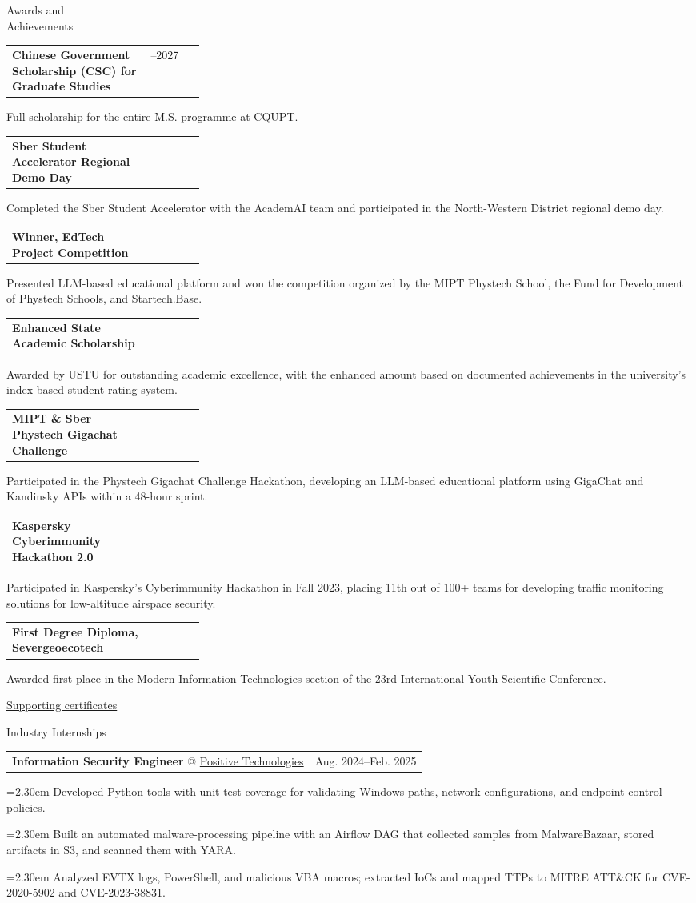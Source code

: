 \documentclass[11pt,a4paper]{article}
\makeatletter
\newcommand{\cvrow}[2]{%
  \noindent
  \begin{minipage}[t]{0.145\textwidth}
    \vspace{0pt}%
    \raggedright
    \fontsize{10.5}{12.5}\selectfont
    #1
  \end{minipage}%
  \hfill
  \begin{minipage}[t]{0.835\textwidth}
    \vspace{0pt}%
    #2
  \end{minipage}\par
}
\newcommand{\entry}[2]{%
  \begin{tabularx}{\linewidth}{@{}X >{\raggedleft\arraybackslash}p{0.28\linewidth}@{}}
    #1 & #2
  \end{tabularx}
}
\newcommand{\workentry}[2]{%
  \noindent
  \begin{tabularx}{\linewidth}
    {@{}X@{\hspace{0.8em}}r@{}}
    #1 & \small #2
  \end{tabularx}\par
  \vspace{0.15em}
}
\newcommand{\workproject}[1]{%
  \noindent
  \hangindent=2.30em
  \hangafter=1
  \hspace*{1.15em}\makebox[1.15em][l]{$\diamond$}#1\par
  \vspace{0.12em}
}
\makeatother
\begin{document}
\cvrow{Awards and\\Achievements}{%
  \entry
    {\textbf{Chinese Government Scholarship (CSC) for Graduate Studies}}
    {2024--2027}
  Full scholarship for the entire M.S. programme at CQUPT.

  \vspace{0.45em}
  \entry
    {\textbf{Sber Student Accelerator Regional Demo Day}}
    {2023}
  Completed the Sber Student Accelerator with the AcademAI team and
  participated in the North-Western District regional demo day.

  \vspace{0.45em}
  \entry
    {\textbf{Winner, EdTech Project Competition}}
    {2023}
  Presented LLM-based educational platform and won the competition organized
  by the MIPT Phystech School, the Fund for Development of Phystech Schools,
  and Startech.Base.

  \vspace{0.45em}
  \entry
    {\textbf{Enhanced State Academic Scholarship}}
    {2023}
  Awarded by USTU for outstanding academic excellence, with the enhanced amount
  based on documented achievements in the university's index-based student rating system.

  \vspace{0.45em}
  \entry
    {\textbf{MIPT \& Sber Phystech Gigachat Challenge}}
    {2023}
  Participated in the Phystech Gigachat Challenge Hackathon, developing
  an LLM-based educational platform using GigaChat and Kandinsky APIs
  within a 48-hour sprint.

  \vspace{0.45em}
  \entry{\textbf{Kaspersky Cyberimmunity Hackathon 2.0}}
  {2023}
  Participated in Kaspersky’s Cyberimmunity Hackathon in Fall 2023,
  placing 11th out of 100+ teams for developing traffic monitoring
  solutions for low-altitude airspace security.

  \vspace{0.45em}
  \entry
    {\textbf{First Degree Diploma, Severgeoecotech}}
    {2022}
  Awarded first place in the Modern Information Technologies section of the
  23rd International Youth Scientific Conference.

  \vspace{0.3em}
  \href{https://iasenovets.github.io/files/certificates_selected_en_public_ready_v2.pdf}
       {\small Supporting certificates}
}

\vspace{0.50em}

\cvrow{Industry Internships}{%
  \workentry
    {\textbf{Information Security Engineer} @
    \href{https://global.ptsecurity.com/en/}{Positive Technologies}}
    {Aug. 2024--Feb. 2025}

  \workproject{Developed Python tools with unit-test coverage for validating
  Windows paths, network configurations, and endpoint-control policies.}
  \workproject{Built an automated malware-processing pipeline with an Airflow DAG
  that collected samples from MalwareBazaar, stored artifacts in S3, and scanned
  them with YARA.}
  \workproject{Analyzed EVTX logs, PowerShell, and malicious VBA macros; extracted
  IoCs and mapped TTPs to MITRE ATT\&CK for CVE-2020-5902 and CVE-2023-38831.}
}
\end{document}
